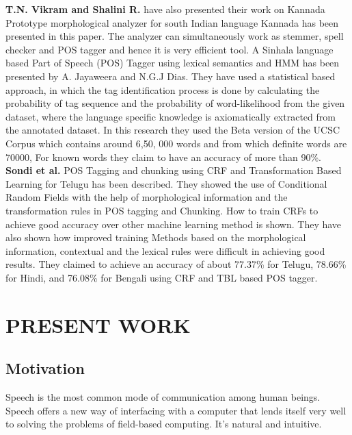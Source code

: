 \documentclass[12pt,a4paper,oneside]{memoir}
\begin{document}
\textbf{T.N. Vikram and Shalini R.} have also presented their work on Kannada Prototype morphological analyzer for south Indian language Kannada has been presented in this paper. The analyzer can simultaneously work as stemmer, spell checker and POS tagger and hence it is very efficient tool.
A Sinhala language based Part of Speech (POS) Tagger using lexical semantics and HMM has been presented by A. Jayaweera and N.G.J Dias. They have used a statistical based approach, in which the tag identification process is done by calculating the probability of tag sequence and the probability of word-likelihood from the given dataset, where the language specific knowledge is axiomatically extracted from the annotated dataset. In this research they used the Beta version of the UCSC Corpus which contains around 6,50, 000 words and from which definite words are 70000, For known words they claim to have an accuracy of more than 90\%. \\ 

\textbf{Sondi et al.} POS Tagging and chunking using CRF and Transformation Based Learning for Telugu has been described. They showed the use of Conditional Random Fields with the help of morphological information and the transformation rules in POS tagging and Chunking. How to train CRFs to achieve good accuracy over other machine learning method is shown. They have also shown how improved training Methods based on the morphological information, contextual and the lexical rules were difficult in achieving good results. They claimed to achieve an accuracy of about 77.37\% for Telugu, 78.66\% for Hindi, and 76.08\% for Bengali using CRF and TBL based POS tagger.\\







\chapter{PRESENT WORK}
\section{Motivation}
Speech is the most common mode of communication among human beings. Speech
offers a new way of interfacing with a computer that lends itself very well to solving
the problems of field-based computing. It's natural and intuitive. 
\end{document}
